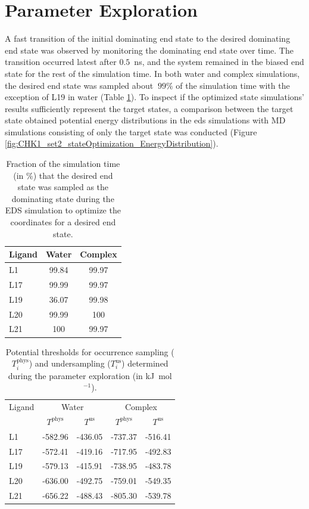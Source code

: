 \section{Parameter Exploration}
A fast transition of the initial dominating end state to the desired dominating end state was observed by monitoring the dominating end state over time.
The transition occurred latest after $0.5$~ns, and the system remained in the biased end state for the rest of the simulation time.
In both water and complex simulations, the desired end state was sampled about $~99\%$ of the simulation time with the exception of L19 in water (Table \ref{SItab:RingCycleOpenin_sampling_fraction_optimizedStates}).
To inspect if the optimized state simulations' results sufficiently represent the target states, a comparison between the target state obtained potential energy distributions in the eds simulations with MD simulations consisting of only the target state was conducted (Figure \ref{fig:CHK1_set2_stateOptimization_EnergyDistribution}). 

\begin{table}[h]
\centering
\caption{Fraction of the simulation time (in \%) that the desired end state was sampled as the dominating state during the EDS simulation to optimize the coordinates for a desired end state.}
\label{SItab:RingCycleOpenin_sampling_fraction_optimizedStates}
\begin{tabular}{ l | c c }
 Ligand & Water  & Complex \\ 
 \hline
     L1 & 99.84 & 99.97 \\ 
     L17 & 99.99 & 99.97\\
     L19 & 36.07 &  99.98\\
     L20 & 99.99 & 100\\
     L21 & 100 & 99.97 \\
\end{tabular}
\end{table}

\begin{table}[h]
\centering
\caption{Potential thresholds for occurrence sampling ($T_{i}^{\text{phys}}$) and undersampling ($T_{i}^{\text{us}}$) determined during the parameter exploration (in kJ~mol$^{-1}$).}
\label{SItab:RingCycleOpenin_PotentialTresholds}
\begin{tabular}{ l | c c |c c| }
 Ligand &\multicolumn{2}{c|}{Water} & \multicolumn{2}{c|}{Complex}\\ 
  & \multicolumn{1}{c}{$T^{\text{phys}}$}& \multicolumn{1}{c|}{$T^{\text{us}}$}&  \multicolumn{1}{c}{$T^{\text{phys}}$}& \multicolumn{1}{c|}{$T^{\text{us}}$} \\ 
 \hline
     L1  & -582.96 & -436.05 & -737.37 & -516.41\\ 
     L17 & -572.41 & -419.16 & -717.95 & -492.83\\
     L19 & -579.13 & -415.91 & -738.95 & -483.78\\
     L20 & -636.00 & -492.75 & -759.01 & -549.35\\
     L21 & -656.22 & -488.43 & -805.30 & -539.78\\
\end{tabular}
\end{table}

